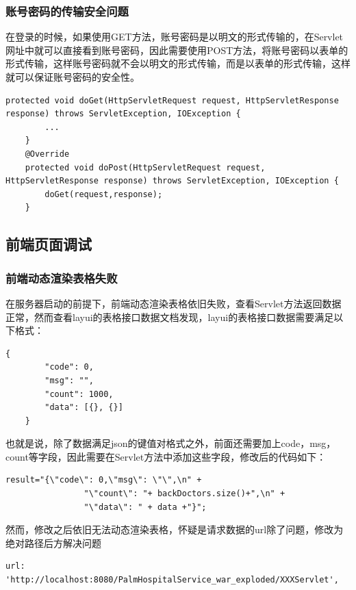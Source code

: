\documentclass[UTF8,12pt]{article}
\begin{document}
\subsubsection{账号密码的传输安全问题}
在登录的时候，如果使用GET方法，账号密码是以明文的形式传输的，在Servlet网址中就可以直接看到账号密码，因此需要使用POST方法，将账号密码以表单的形式传输，这样账号密码就不会以明文的形式传输，而是以表单的形式传输，这样就可以保证账号密码的安全性。

\begin{lstlisting}[frame=shadowbox]
    protected void doGet(HttpServletRequest request, HttpServletResponse response) throws ServletException, IOException {
        ...
    }
    @Override
    protected void doPost(HttpServletRequest request, HttpServletResponse response) throws ServletException, IOException {
        doGet(request,response);
    }
\end{lstlisting}

\subsection{前端页面调试}
\subsubsection{前端动态渲染表格失败}
在服务器启动的前提下，前端动态渲染表格依旧失败，查看Servlet方法返回数据正常，然而查看layui的表格接口数据文档发现，layui的表格接口数据需要满足以下格式：

\begin{lstlisting}[frame=shadowbox]
    {
        "code": 0,
        "msg": "",
        "count": 1000,
        "data": [{}, {}]
    }
\end{lstlisting}

也就是说，除了数据满足json的键值对格式之外，前面还需要加上code，msg，count等字段，因此需要在Servlet方法中添加这些字段，修改后的代码如下：

\begin{lstlisting}[frame=shadowbox]
    result="{\"code\": 0,\"msg\": \"\",\n" +
                "\"count\": "+ backDoctors.size()+",\n" +
                "\"data\": " + data +"}";
\end{lstlisting}

然而，修改之后依旧无法动态渲染表格，怀疑是请求数据的url除了问题，修改为绝对路径后方解决问题

\begin{lstlisting}[frame=shadowbox]
    url: 'http://localhost:8080/PalmHospitalService_war_exploded/XXXServlet',
\end{lstlisting}
\end{document}
